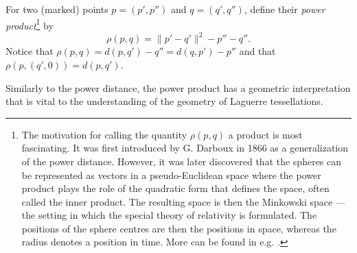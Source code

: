 \begin{definition}
	For two (marked) points $p=(p',p'')$ and $q=(q',q'')$, define their \textit{power product}\footnote{ The motivation for calling the quantity $\rho(p,q)$ a product is most fascinating. It was first introduced by G. Darboux in 1866 as a generalization of the power distance. However, it was later discovered that the spheres can be represented as vectors in a pseudo-Euclidean space where the power product plays the role of the quadratic form that defines the space, often called the inner product. The resulting space is then the Minkowski space --- the setting in which the special theory of relativity is formulated. The positions of the sphere centres are then the positions in space, whereas the radius denotes a position in time. More can be found in e.g. \cite{Kocik2007}.} by 
$$\rho(p,q) = \|p'-q'\|^2 - p'' - q''.$$
Notice that $\rho(p,q) = d(p,q') - q'' = d(q,p') - p''$ and that $\rho(p,(q',0)) = d(p,q')$.
\end{definition}

Similarly to the power distance, the power product has a geometric interpretation that is vital to the understanding of the geometry of Laguerre tessellations.







